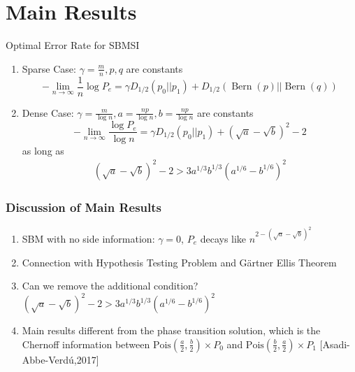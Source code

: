 \documentclass{beamer}
\DeclareMathOperator{\Bern}{Bern}
\begin{document}
\section{Main Results}
\begin{frame}{Optimal Error Rate for SBMSI}
\begin{enumerate}
	\item Sparse Case: $\gamma=\frac{m}{n}, p, q$ are constants
		\begin{equation*}
		-\lim_{n\to \infty} \frac{1}{n}\log P_e =  \gamma D_{1/2}(p_0 || p_1) + D_{1/2}(\Bern(p)||\Bern(q))
		\end{equation*}
	\item Dense Case: $\gamma=\frac{m}{ \log n},
	a=\frac{np}{\log n}, b=\frac{np}{\log n}$ are constants
		\begin{equation*}\label{eq:PeMainL}
		-\lim_{n\to \infty}\frac{\log P_e}{\log n}=\gamma D_{1/2}(p_0||p_1) + (\sqrt{a} - \sqrt{b})^2-2
		\end{equation*}
		as long as
		\begin{align*}
			(\sqrt{a}-\sqrt{b})^2-2 
			> 3a^{1/3}b^{1/3}(a^{1/6}-b^{1/6})^2\label{eq:oneC}
		\end{align*}	
\end{enumerate}
\end{frame}
\begin{frame}
\frametitle{Discussion of Main Results}
\begin{enumerate}
	\item SBM with no side information: $\gamma = 0$, $P_e$ decays like $n^{2-(\sqrt{a} - \sqrt{b})^2}$
	\item Connection with Hypothesis Testing Problem and Gärtner Ellis Theorem
	\item Can we remove the additional condition?
	$(\sqrt{a}-\sqrt{b})^2-2 
	> 3a^{1/3}b^{1/3}(a^{1/6}-b^{1/6})^2$
	\item Main results different from the phase transition solution,
	which is the Chernoff information
	between $\textrm{Pois}(\frac{a}{2},\frac{b}{2})\times P_0$ and $\textrm{Pois}(\frac{b}{2}, \frac{a}{2})\times P_1$
	[Asadi-Abbe-Verdú,2017]
\end{enumerate}

\end{frame}
\end{document}
